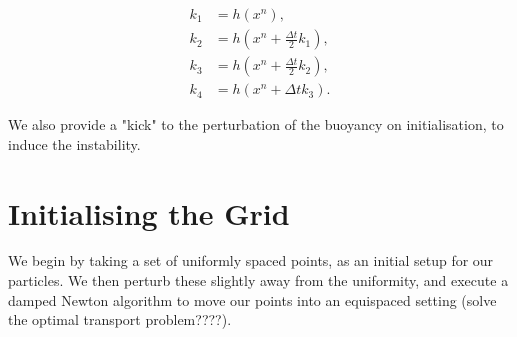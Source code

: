 \documentclass[11pt, oneside]{article}   	%
\newcommand{\dt}{\Delta t}
\begin{document}
\begin{align} 
k_1 &= h(x^n), \\
k_2 &= h(x^n + \frac{\dt}{2}k_1), \\
k_3 &= h(x^n + \frac{\dt}{2}k_2), \\
k_4 &= h(x^n + \dt k_3).
\end{align}

We also provide a "kick" to the perturbation of the buoyancy on initialisation, to induce the instability.


\section{Initialising the Grid}

We begin by taking a set of uniformly spaced points, as an initial setup for our particles. We then perturb these slightly away from the uniformity, and execute a damped Newton algorithm to move our points into an equispaced setting (solve the optimal transport problem????).
\end{document}
